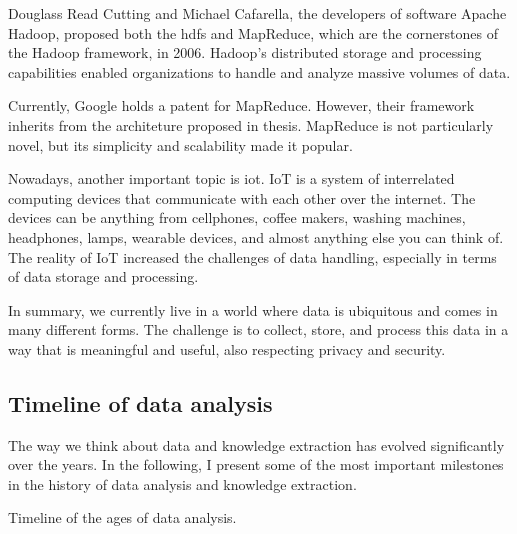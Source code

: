 Douglass Read Cutting and Michael Cafarella, the developers of software Apache Hadoop,
proposed both the \gls{hdfs} and MapReduce, which are the
cornerstones of the Hadoop framework, in 2006.  Hadoop's distributed storage and
processing capabilities enabled organizations to handle and analyze massive volumes of
data.

Currently, Google holds a patent for
MapReduce.
However, their framework inherits from the architeture proposed in
\textcite{Hillis1985} thesis.
MapReduce is not particularly novel, but its simplicity and scalability made it popular.

Nowadays, another important topic is \gls{iot}.  IoT is a system of
interrelated computing devices that communicate with each other over the internet.
The devices can be anything from cellphones, coffee makers, washing machines, headphones,
lamps, wearable devices, and almost anything else you can think of.  The reality of IoT increased the
challenges of data handling, especially in terms of data storage and processing.

In summary, we currently live in a world where data is ubiquitous and comes in many
different forms.  The challenge is to collect, store, and process this data in a way that
is meaningful and useful, also respecting privacy and security.

\subsection{Timeline of data analysis}
\label{sub:time-analysis}

The way we think about data and knowledge extraction has evolved significantly over the
years.  In the following, I present some of the most important milestones in the history
of data analysis and knowledge extraction.

\begin{figurebox}[label=fig:data-analysis-history]{Timeline of the ages of data analysis.}
  \centering
\end{figurebox}

